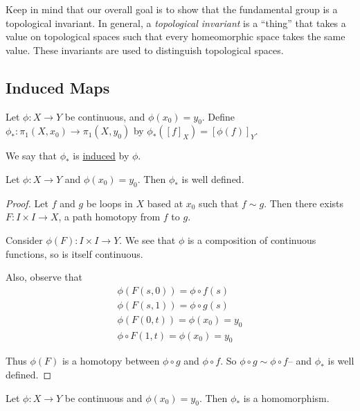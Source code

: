 Keep in mind that our overall goal is to show that the fundamental group is a topological invariant. In general, a \emph{topological invariant} is a ``thing'' that takes a value on topological spaces such that every homeomorphic space takes the same value. These invariants are used to distinguish topological spaces.

\subsection{Induced Maps} 
\begin{definition}
	Let $\phi:X\to Y$ be continuous, and $\phi(x_0)=y_0$. Define $\phi_*: \pi_1(X,x_0)\to \pi_1(X,y_0)$ by $\phi_*([f]_X)=[\phi(f)]_Y.$
	
	We say that $\phi_*$ is \underline{induced} by $\phi$. 
\end{definition}
\begin{smallfact}
	 Let $\phi:X\to Y$ and $\phi(x_0)=y_0$. Then $\phi_*$ is well defined. 
\end{smallfact}
\begin{proof}
	Let $f$ and $g$ be loops in $X$ based at $x_0$ such that $f\sim g$. Then there exists $F:I\times I\to X$, a path homotopy from $f$ to $g$. \vspace{.4in}
	
	Consider $\phi(F): I\times I \to Y$. We see that $\phi$ is a composition of continuous functions, so is itself continuous. 
	
	Also, observe that 
	\begin{align*}
		\phi(F(s,0)) =\phi\circ f(s)\\
		\phi(F(s,1)) =\phi\circ g(s)\\
		\phi(F(0,t)) =\phi(x_0) = y_0\\
		\phi\circ F(1,t) =\phi(x_0)=y_0 
	\end{align*}
	
	Thus $\phi(F)$ is a homotopy between $\phi\circ g$ and $\phi\circ f$. So $\phi\circ g\sim \phi\circ f$-- and $\phi_*$ is well defined. 
\end{proof}
\begin{lemma}
	Let $\phi:X\to Y$ be continuous and $\phi(x_0)=y_0$. Then $\phi_*$ is a homomorphism. 
\end{lemma}
